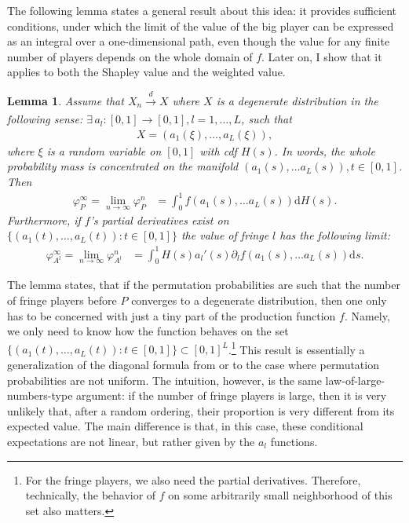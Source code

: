 \documentclass[a4paper]{article}
\newtheorem{lemma}{Lemma}
\newcommand{\ds}{\mathrm{d}s}
\begin{document}
The following lemma states a general result about this idea: it provides sufficient conditions, under which the limit of the value of the big player can be expressed as an integral over a one-dimensional path, even though the value for any finite number of players depends on the whole domain of $f$.
Later on, I show that it applies to both the Shapley value and the weighted value.
\begin{lemma}
    \label{lem:many_sided_manifold}
    Assume that $X_n \xrightarrow[]{d} X$ where $X$ is a degenerate distribution in the following sense: $\exists \, a_l: [0, 1] \to [0, 1], l = 1, \dots, L$, such that
    \begin{align*}
        X = (a_1(\xi), \dots, a_L(\xi)),
    \end{align*}
    where $\xi$ is a random variable on $[0, 1]$ with cdf $H(s)$.
    In words, the whole probability mass is concentrated on the manifold $(a_1(s), \dots a_L(s)), t \in [0, 1]$.
    Then
    \begin{align*}
        \varphi_P^\infty = \lim_{n \to \infty} \varphi_P^n &= \int_0^1 f(a_1(s), \dots a_L(s)) \mathrm{d}H(s).
    \end{align*}
    Furthermore, if $f$'s partial derivatives exist on $\{(a_1(t), \dots, a_L(t)) : t \in [0, 1]\}$ the value of fringe $l$ has the following limit:
    \begin{align*}
        \varphi_{A^l}^\infty = \lim_{n \to \infty} \varphi_{A^l}^n &= \int_0^1 H(s) a_l'(s) \partial_l f(a_1(s), \dots a_L(s)) \ds.
    \end{align*}
\end{lemma}

The lemma states, that if the permutation probabilities are such that the number of fringe players before $P$ converges to a degenerate distribution, then one only has to be concerned with just a tiny part of the production function $f$.
Namely, we only need to know how the function behaves on the set $\{(a_1(t), \dots, a_L(t)) : t \in [0, 1]\} \subset [0, 1]^L$.\footnote{
    For the fringe players, we also need the partial derivatives.
    Therefore, technically, the behavior of $f$ on some arbitrarily small neighborhood of this set also matters.
}
This result is essentially a generalization of the diagonal formula from \textcite{aumann2015values} or \textcite{stole1996intra} to the case where permutation probabilities are not uniform.
The intuition, however, is the same law-of-large-numbers-type argument: if the number of fringe players is large, then it is very unlikely that, after a random ordering, their proportion is very different from its expected value.
The main difference is that, in this case, these conditional expectations are not linear, but rather given by the $a_l$ functions.
\end{document}
